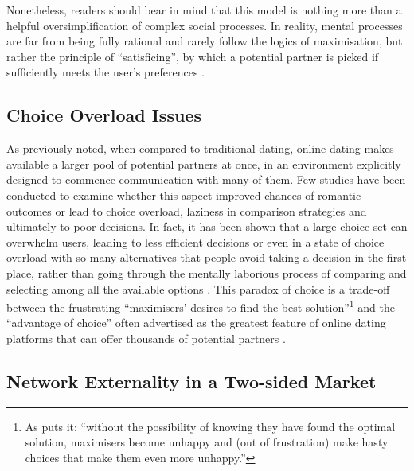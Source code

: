 Nonetheless, readers should bear in mind that this model is nothing
more than a helpful oversimplification of complex social processes.
In reality, mental processes are far from being fully rational and
rarely follow the logics of maximisation, but rather the principle
of \textquotedblleft satisficing\textquotedblright , by which a potential
partner is picked if sufficiently meets the user's preferences \citep{Simon1956Rational-choice}.


\subsection{Choice Overload Issues}

As previously noted, when compared to traditional dating, online dating
makes available a larger pool of potential partners at once, in an
environment explicitly designed to commence communication with many
of them. Few studies have been conducted to examine whether this aspect
improved chances of romantic outcomes or lead to choice overload,
laziness in comparison strategies and ultimately to poor decisions.
In fact, it has been shown that a large choice set can overwhelm users,
leading to less efficient decisions or even in a state of choice overload
with so many alternatives that people avoid taking a decision in the
first place, rather than going through the mentally laborious process
of comparing and selecting among all the available options \citep{Finkel2012Online-Dating:-}.
This paradox of choice is a trade-off between the frustrating \textquotedblleft maximisers\textquoteright{}
desires to find the best solution\textquotedblright \footnote{As \citet{Rosenfeld2017Marriage-Choice} puts it: \textquotedblleft without
the possibility of knowing they have found the optimal solution, maximisers
become unhappy and (out of frustration) make hasty choices that make
them even more unhappy.\textquotedblright{}} and the \textquotedblleft advantage of choice\textquotedblright{}
often advertised as the greatest feature of online dating platforms
that can offer thousands of potential partners \citep{Rosenfeld2017Marriage-Choice}.

\subsection{Network Externality in a Two-sided Market}

